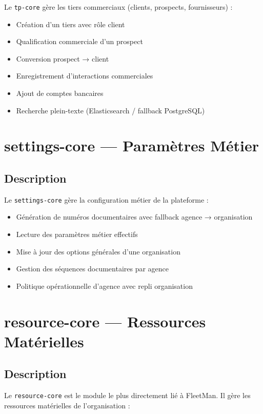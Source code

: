 \documentclass[12pt,a4paper]{report}
\begin{document}
Le \texttt{tp-core} gère les tiers commerciaux (clients, prospects, fournisseurs) :

\begin{itemize}[leftmargin=2cm]
  \item Création d'un tiers avec rôle client
  \item Qualification commerciale d'un prospect
  \item Conversion prospect → client
  \item Enregistrement d'interactions commerciales
  \item Ajout de comptes bancaires
  \item Recherche plein-texte (Elasticsearch / fallback PostgreSQL)
\end{itemize}

\section{settings-core — Paramètres Métier}

\subsection{Description}

Le \texttt{settings-core} gère la configuration métier de la plateforme :

\begin{itemize}[leftmargin=2cm]
  \item Génération de numéros documentaires avec fallback agence → organisation
  \item Lecture des paramètres métier effectifs
  \item Mise à jour des options générales d'une organisation
  \item Gestion des séquences documentaires par agence
  \item Politique opérationnelle d'agence avec repli organisation
\end{itemize}

\section{resource-core — Ressources Matérielles}

\subsection{Description}

Le \texttt{resource-core} est le module le plus directement lié à FleetMan. Il gère les ressources matérielles de l'organisation :
\end{document}
